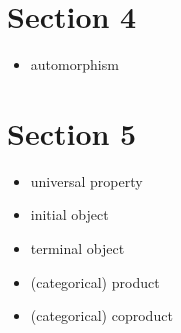 \section*{Section 4}

\begin{itemize}
	\item automorphism
\end{itemize}

\section*{Section 5}

\begin{itemize}
	\item universal property
	\item initial object
	\item terminal object
	\item (categorical) product
	\item (categorical) coproduct
\end{itemize}
